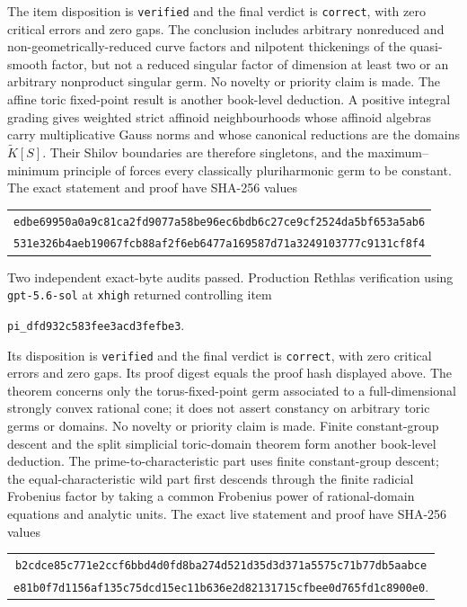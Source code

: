 The item disposition is \texttt{verified} and the final verdict is
\texttt{correct}, with zero critical errors and zero gaps.
The conclusion includes arbitrary nonreduced and
non-geometrically-reduced curve factors and nilpotent thickenings of the
quasi-smooth factor, but not a reduced singular factor of dimension at least
two or an arbitrary nonproduct singular germ.  No novelty or priority claim
is made.
The affine toric fixed-point result
 is another book-level
deduction.  A positive integral grading gives weighted strict affinoid
neighbourhoods whose affinoid algebras carry multiplicative Gauss norms and
whose canonical reductions are the domains \(\widetilde K[S]\).  Their
Shilov boundaries are therefore singletons, and the maximum--minimum
principle of \cite[Proposition~7.3]{GR25Classical} forces every classically
pluriharmonic germ to be constant.  The exact statement and proof have
SHA-256 values
\begin{center}
\small
\begin{tabular}{@{}c@{}}
\nolinkurl{edbe69950a0a9c81ca2fd9077a58be96ec6bdb6c27ce9cf2524da5bf653a5ab6}\\
\nolinkurl{531e326b4aeb19067fcb88af2f6eb6477a169587d71a3249103777c9131cf8f4}
\end{tabular}
\end{center}
Two independent exact-byte audits passed.  Production Rethlas verification
using \texttt{gpt-5.6-sol} at \texttt{xhigh} returned controlling item
\begin{center}
\small
\nolinkurl{pi_dfd932c583fee3acd3fefbe3}.
\end{center}
Its disposition is \texttt{verified} and the final verdict is
\texttt{correct}, with zero critical errors and zero gaps.  Its proof digest
equals the proof hash displayed above.  The theorem concerns
only the torus-fixed-point germ associated to a full-dimensional strongly
convex rational cone; it does not assert constancy on arbitrary toric germs
or domains.  No novelty or priority claim is made.
Finite constant-group descent and the split simplicial toric-domain theorem
form another book-level deduction.  The prime-to-characteristic part uses
finite constant-group descent; the equal-characteristic wild part first
descends through the finite radicial Frobenius factor by taking a common
Frobenius power of rational-domain equations and analytic units.  The exact
live statement and proof have SHA-256 values
\begin{center}
\small
\begin{tabular}{@{}c@{}}
\nolinkurl{b2cdce85c771e2ccf6bbd4d0fd8ba274d521d35d3d371a5575c71b77db5aabce}\\
\nolinkurl{e81b0f7d1156af135c75dcd15ec11b636e2d82131715cfbee0d765fd1c8900e0}.
\end{tabular}
\end{center}
